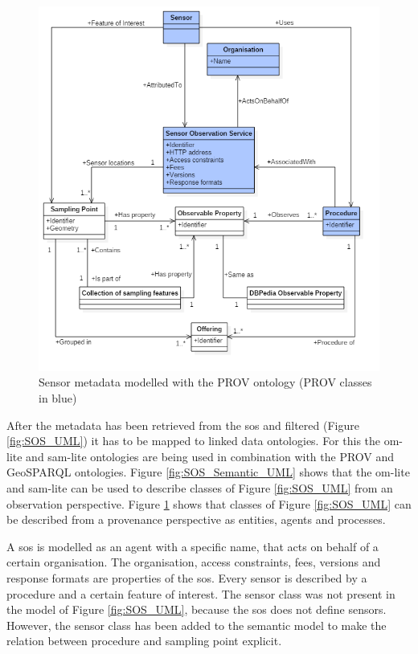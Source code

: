 \begin{figure}
	\centering
	\includegraphics[width=1\linewidth]{UML/SOS_Semantic_UML_3.PNG}
	\caption{Sensor metadata modelled with the PROV ontology (PROV classes in blue)}
	\label{fig:SOS_Semantic_UML2}
\end{figure}

After the metadata has been retrieved from the \ac{sos} and filtered (Figure \ref{fig:SOS_UML}) it has to be mapped to linked data ontologies. For this the om-lite and sam-lite ontologies are being used in combination with the PROV and GeoSPARQL ontologies. Figure \ref{fig:SOS_Semantic_UML} shows that the om-lite and sam-lite can be used to describe classes of Figure \ref{fig:SOS_UML} from an observation perspective. Figure \ref{fig:SOS_Semantic_UML2} shows that classes of Figure \ref{fig:SOS_UML} can be described from a provenance perspective as entities, agents and processes.     

A \ac{sos} is modelled as an agent with a specific name, that acts on behalf of a certain organisation. The organisation, access constraints, fees, versions and response formats are properties of the \ac{sos}. Every sensor is described by a procedure and a certain feature of interest. The sensor class was not present in the model of Figure \ref{fig:SOS_UML}, because the \ac{sos} does not define sensors. However, the sensor class has been added to the semantic model to make the relation between procedure and sampling point explicit. 

